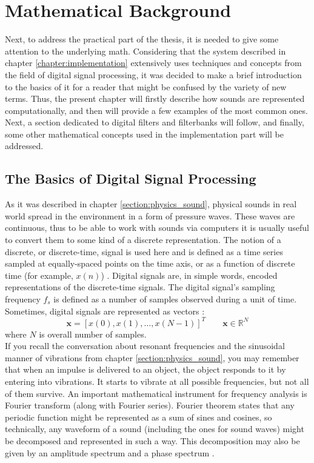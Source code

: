 \chapter{Mathematical Background}\label{chapter:math}

Next, to address the practical part of the thesis, it is needed to give some attention to the underlying math. Considering that the system described in chapter \ref{chapter:implementation} extensively uses techniques and concepts from the field of digital signal processing, it was decided to make a brief introduction to the basics of it for a reader that might be confused by the variety of new terms. Thus, the present chapter will firstly describe how sounds are represented computationally, and then will provide a few examples of the most common ones. Next, a section dedicated to digital filters and filterbanks will follow, and finally, some other mathematical concepts used in the implementation part will be addressed.

\section{The Basics of Digital Signal Processing}\label{section:math_basics}

As it was described in chapter \ref{section:physics_sound}, physical sounds in real world spread in the environment in a form of pressure waves. These waves are continuous, thus to be able to work with sounds via computers it is usually useful to convert them to some kind of a discrete representation. The notion of a discrete, or discrete-time, signal is used here and is defined as a time series sampled at equally-spaced points on the time axis, or as a function of discrete time (for example, $x(n)$) \cite{Shenoi2005}. Digital signals are, in simple words, encoded representations of the discrete-time signals. The digital signal's sampling frequency $f_s$ is defined as a number of samples observed during a unit of time. Sometimes, digital signals are represented as vectors \cite{Abood2020}: \begin{equation}
	\textbf{x} = [x(0), x(1), \dots{}, x(N - 1)]^T\qquad\textbf{x}\in\mathbb{R}^N
\end{equation}
where $N$ is overall number of samples.\\

If you recall the conversation about resonant frequencies and the sinusoidal manner of vibrations from chapter \ref{section:physics_sound}, you may remember that when an impulse is delivered to an object, the object responds to it by entering into vibrations. It starts to vibrate at all possible frequencies, but not all of them survive. An important mathematical instrument for frequency analysis is Fourier transform (along with Fourier series). Fourier theorem states that any periodic function might be represented as a sum of sines and cosines, so technically, any waveform of a sound (including the ones for sound waves) might be decomposed and represented in such a way. This decomposition may also be given by an amplitude spectrum and a phase spectrum \cite{Schnupp2011}.\\

